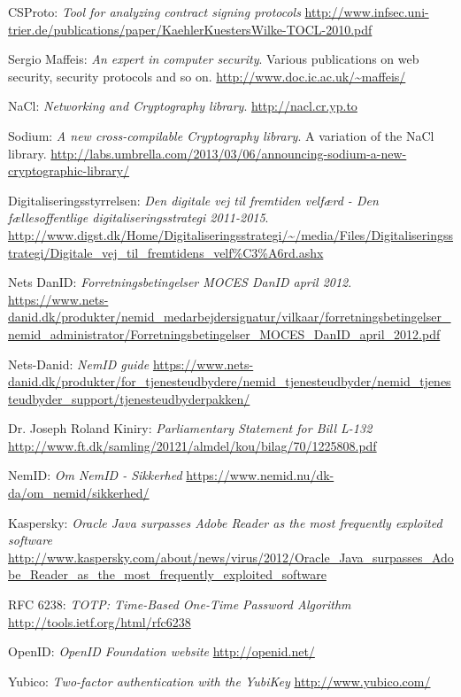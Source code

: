 \documentclass[twosided]{report}
\begin{document}
\begin{thebibliography}{9}
 CSProto:
 \emph{Tool for analyzing contract signing protocols}
 \url{http://www.infsec.uni-trier.de/publications/paper/KaehlerKuestersWilke-TOCL-2010.pdf}

 Sergio Maffeis:
 \emph{An expert in computer security}.
 Various publications on web security, security protocols and so on.
 \url{http://www.doc.ic.ac.uk/~maffeis/}

 NaCl:
 \emph{Networking and Cryptography library}.
 \url{http://nacl.cr.yp.to}

 Sodium:
 \emph{A new cross-compilable Cryptography library}.
 A variation of the NaCl library.
 \url{http://labs.umbrella.com/2013/03/06/announcing-sodium-a-new-cryptographic-library/}

 Digitaliseringsstyrrelsen:
 \emph{Den digitale vej til fremtiden velf{\ae}rd - Den f{\ae}llesoffentlige digitaliseringsstrategi 2011-2015}.
 \url{http://www.digst.dk/Home/Digitaliseringsstrategi/~/media/Files/Digitaliseringsstrategi/Digitale_vej_til_fremtidens_velf\%C3\%A6rd.ashx}

 Nets DanID:
 \emph{Forretningsbetingelser MOCES DanID april 2012}.
 \url{https://www.nets-danid.dk/produkter/nemid_medarbejdersignatur/vilkaar/forretningsbetingelser_nemid_administrator/Forretningsbetingelser_MOCES_DanID_april_2012.pdf}

 Nets-Danid:
 \emph{NemID guide}
 \url{https://www.nets-danid.dk/produkter/for_tjenesteudbydere/nemid_tjenesteudbyder/nemid_tjenesteudbyder_support/tjenesteudbyderpakken/}

 Dr. Joseph Roland Kiniry:
 \emph{Parliamentary Statement for Bill L-132}
 \url{http://www.ft.dk/samling/20121/almdel/kou/bilag/70/1225808.pdf}

 NemID:
 \emph{Om NemID - Sikkerhed}
 \url{https://www.nemid.nu/dk-da/om_nemid/sikkerhed/}

 Kaspersky:
 \emph{Oracle Java surpasses Adobe Reader as the most frequently exploited software}
 \url{http://www.kaspersky.com/about/news/virus/2012/Oracle_Java_surpasses_Adobe_Reader_as_the_most_frequently_exploited_software}

 RFC 6238:
 \emph{TOTP: Time-Based One-Time Password Algorithm}
 \url{http://tools.ietf.org/html/rfc6238}

 OpenID:
 \emph{OpenID Foundation website}
 \url{http://openid.net/}

 Yubico:
 \emph{Two-factor authentication with the YubiKey}
 \url{http://www.yubico.com/}

\end{thebibliography}
\end{document}
